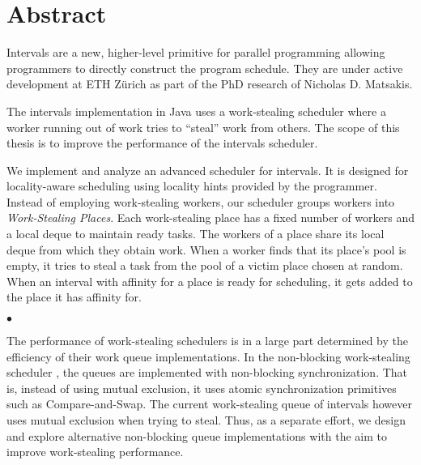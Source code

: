 
\chapter*{Abstract}
\label{chap:abstract}

Intervals are a new, higher-level primitive for parallel programming
allowing programmers to directly construct the program schedule. They
are under active development at ETH Zürich as part of the PhD research
of Nicholas D. Matsakis.

The intervals implementation in Java uses a work-stealing scheduler
where a worker running out of work tries to ``steal'' work from
others. The scope of this thesis is to improve the performance of the
intervals scheduler.

We implement and analyze an advanced scheduler for intervals. It is
designed for locality-aware scheduling using locality hints provided
by the programmer. Instead of employing work-stealing workers, our
scheduler groups workers into \emph{Work-Stealing Places}. Each
work-stealing place has a fixed number of workers and a local deque to
maintain ready tasks. The workers of a place share its local deque
from which they obtain work. When a worker finds that its place's pool
is empty, it tries to steal a task from the pool of a victim place
chosen at random. When an interval with affinity for a place is ready
for scheduling, it gets added to the place it has affinity for.

\begin{center}
  $\bullet$
\end{center}

The performance of work-stealing schedulers is in a large part
determined by the efficiency of their work queue implementations. In
the non-blocking work-stealing scheduler \cite{Arora1998}, the queues
are implemented with non-blocking synchronization. That is, instead of
using mutual exclusion, it uses atomic synchronization primitives such
as Compare-and-Swap. The current work-stealing queue of intervals
however uses mutual exclusion when trying to steal. Thus, as a
separate effort, we design and explore alternative non-blocking queue
implementations with the aim to improve work-stealing performance.


